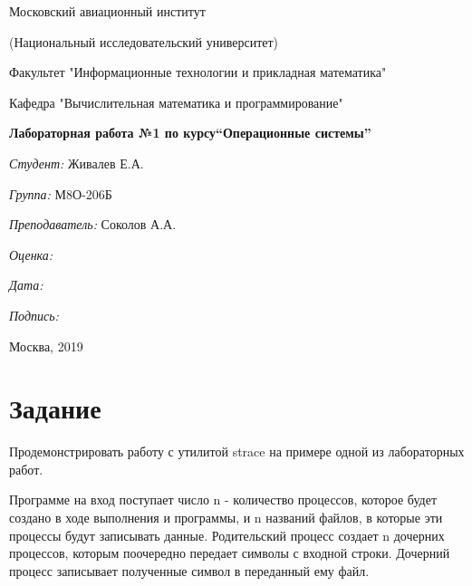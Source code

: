 \documentclass[a4paper, 12pt]{article}
\begin{document}
\thispagestyle{empty}	
\begin{center}
	Московский авиационный институт
	
	(Национальный исследовательский университет)
	
	Факультет "Информационные технологии и прикладная математика"
	
	Кафедра "Вычислительная математика и программирование"
	
\end{center}
\vspace{40ex}
\begin{center}
	\textbf{\large{Лабораторная работа №1 по курсу\linebreak \textquotedblleft Операционные системы\textquotedblright}}
\end{center}
\vspace{35ex}
\begin{flushright}
	\textit{Студент: } Живалев Е.А.
	
	\vspace{2ex}
	\textit{Группа: } М8О-206Б
	
	\vspace{2ex}
	\textit{Преподаватель: } Соколов А.А.
	
	
	\vspace{2ex}
	\textit{Оценка: } \underline{\quad\quad\quad\quad\quad\quad}
	
	 \vspace{2ex}
	\textit{Дата: } \underline{\quad\quad\quad\quad\quad\quad}
	
	\vspace{2ex}
	\textit{Подпись: } \underline{\quad\quad\quad\quad\quad\quad}
	
\end{flushright}

\vspace{5ex}

\begin{vfill}
	\begin{center}
		Москва, 2019
	\end{center}	
\end{vfill}
\newpage

\section{Задание}

Продемонстрировать работу с утилитой strace на примере одной из лабораторных работ.

Программе на вход поступает число n - количество процессов, которое будет создано в ходе выполнения и программы, и n названий файлов, в которые эти процессы будут записывать данные. Родительский процесс создает n дочерних процессов, которым поочередно передает символы с входной строки. Дочерний процесс записывает полученные символ в переданный ему файл.
\end{document}
